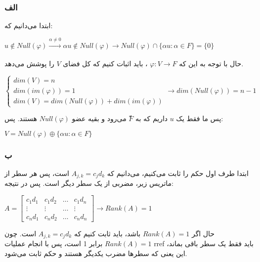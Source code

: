 \subsubsection*{الف}
ابتدا می‌دانیم که:

\setLTR
$
u \notin Null(\varphi) \xrightarrow[]{\alpha \neq 0} \alpha u \notin Null(\varphi) \longrightarrow Null(\varphi) \cap \{ \alpha u : \alpha \in F \} = \{0\}
$
\setRTL

حال با توجه به این که
$\varphi : V \rightarrow F$
، 
باید اثبات کنیم که کل فضای 
$V$
را پوشش می‌دهد.

\setLTR
$
\begin{cases}
	dim(V) = n \\
	dim(im(\varphi)) = 1 \\
	dim(V) = dim(Null(\varphi)) + dim(im(\varphi))
\end{cases} \longrightarrow dim(Null(\varphi)) = n - 1
$
\setRTL

پس ما فقط یک 
$u$
داریم که به
$ّF$
می‌رود و بقیه عضو 
$Null(\varphi)$
هستند. پس:

\setLTR
$
V = Null(\varphi) \oplus \{ \alpha u : \alpha \in F \}
$
\setRTL

\subsubsection*{ب}
ابتدا طرف اول حکم را ثابت می‌کنیم، می‌دانیم که 
$
A_{j,k} = c_jd_k
$
است، پس هر سطر از ماتریس زیر، مضربی از یک سطر دیگر است. پس در نتیجه:

\setLTR
$A = \begin{bmatrix}
	c_1d_1 & c_1d_2 & \hdots & c_1d_n \\
	\vdots & \vdots & \hdots & \vdots \\
	c_nd_1 & c_nd_2 & \hdots & c_nd_n 
\end{bmatrix} \longrightarrow Rank(A) = 1$
\setRTL

حال اگر 
$Rank(A) = 1$
باشد، باید ثابت کنیم که 
$A_{j,k} = c_jd_k$
است. چون 
$Rank(A) = 1$
برابر 1 است، پس با انجام عملیات rref باید فقط یک سطر باقی بماند، این یعنی که سطرها مضرب یکدیگر هستند و حکم ثابت می‌شود.
